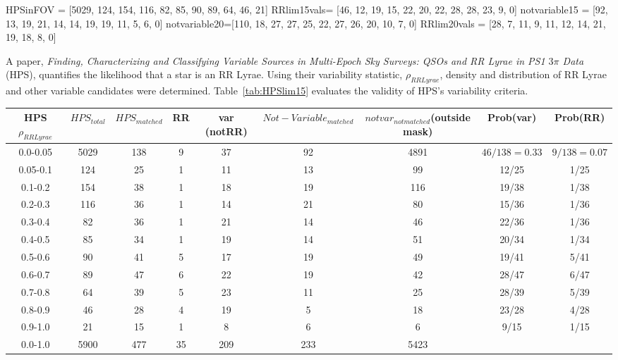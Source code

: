 \documentclass[aps,prb,twocolumn,superscriptaddress]{revtex4-1}
\begin{document}
	HPSinFOV = [5029, 124, 154, 116, 82, 85, 90, 89, 64, 46, 21]
	RRlim15vals= [46, 12, 19, 15, 22, 20, 22, 28, 28, 23, 9, 0]
	notvariable15 = [92, 13, 19, 21, 14, 14, 19, 19, 11, 5, 6, 0]
	notvariable20=[110, 18, 27, 27, 25, 22, 27, 26, 20, 10, 7, 0]
	RRlim20vals =  [28, 7, 11, 9, 11, 12, 14, 21, 19, 18, 8, 0]
\fi

A paper, \textit{Finding, Characterizing and Classifying Variable Sources in Multi-Epoch Sky Surveys: QSOs and RR Lyrae in PS1 $3\pi$ Data}~\cite{PSdata} (HPS), quantifies the likelihood that a star is an RR Lyrae.  Using their variability statistic, $\rho_{RRLyrae}$, density and distribution of RR Lyrae and other variable candidates were determined.  Table~\ref{tab:HPSlim15} evaluates the validity of HPS's variability criteria.
\iffalse
	\begin{table*}
	\begin{center}
		\begin{tabular}{|c|c|c|c|c|c|c|c|c|}\hline
	HPS $\rho_{RRLyrae}$ & $HPS_{total}$ & $HPS_{matched}$ & RR & var (notRR) & $Not-Variable_{matched}$ &$notvar_{notmatched}$(outside mask)& Prob(var)&Prob(RR) \\ \hline
	0.0-0.05 & 5029 & 138 & 9 & 37 & 92 	& 4891 & $46/138=0.33$ & $9/138=0.07$	\\ \hline
	0.05-0.1 & 124 & 25 & 1 & 11 & 13 		& 99 & 12/25 & 1/25 \\ \hline
	0.1-0.2 & 154 & 38 & 1 & 18 & 19 		& 116 & 19/38 & 1/38 \\ \hline
	0.2-0.3 & 116 & 36 & 1 & 14 & 21 		& 80 & 15/36 & 1/36 \\ \hline
	0.3-0.4 & 82 & 36 & 1 & 21 & 14 		& 46 & 22/36 & 1/36	\\ \hline
	0.4-0.5 & 85 & 34 & 1 & 19 & 14 		& 51 & 20/34 & 1/34	\\ \hline
	0.5-0.6 & 90 & 41 & 5 & 17 & 19 		& 49 & 19/41 & 5/41	\\ \hline
	0.6-0.7 & 89 & 47 & 6 & 22 & 19 		& 42 & 28/47 & 6/47	\\ \hline
	0.7-0.8 & 64 & 39 & 5 & 23 & 11 		& 25 & 28/39 & 5/39	\\ \hline
	0.8-0.9 & 46 & 28 & 4 & 19 & 5 			& 18 & 23/28 & 4/28	\\ \hline
	0.9-1.0 & 21 & 15 & 1 & 8 & 6 			& 6 & 9/15 & 1/15	\\ \hline
	\hline
	0.0-1.0 & 5900 & 477 & 35 & 209 & 233 	& 5423 & & \\ \hline
		\end{tabular}
	\end{center}
	\caption{ \small{A comparison of observations to HPS RR Lyrae candidates. \label{tab:HPSlim15}}}
	\end{table*}
\end{document}
